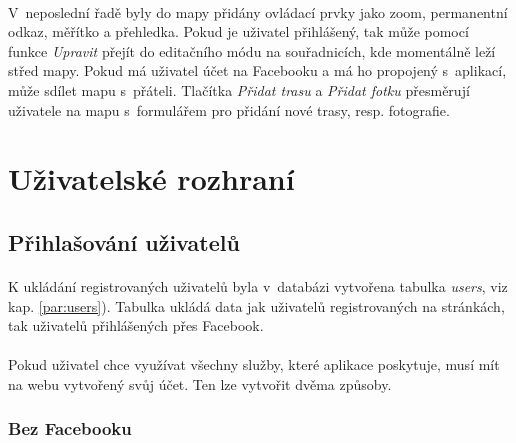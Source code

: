 \documentclass[11pt,a4paper,titlepage,oneside]{book}
\begin{document}

			\paragraph{} V~neposlední řadě byly do mapy přidány ovládací prvky jako zoom, permanentní odkaz, měřítko a přehledka. Pokud je uživatel přihlášený, tak může pomocí funkce \textit{Upravit} přejít do editačního módu na souřadnicích, kde momentálně leží střed mapy. Pokud má uživatel účet na Facebooku a má ho propojený s~aplikací, může sdílet mapu s~přáteli. Tlačítka \textit{Přidat trasu} a \textit{Přidat fotku} přesměrují uživatele na mapu s~formulářem pro přidání nové trasy, resp. fotografie.
			
		\section{Uživatelské rozhraní}
			\subsection{Přihlašování uživatelů}



				\paragraph{}K ukládání registrovaných uživatelů byla v~databázi vytvořena tabulka \textit{users}, viz kap. \ref{par:users}). Tabulka ukládá data jak uživatelů registrovaných na stránkách, tak uživatelů přihlášených přes Facebook.


					\paragraph{} Pokud uživatel chce využívat všechny služby, které aplikace poskytuje, musí mít na webu vytvořený svůj účet. Ten lze vytvořit dvěma způsoby.
					\subsubsection{Bez Facebooku} 
\end{document}
